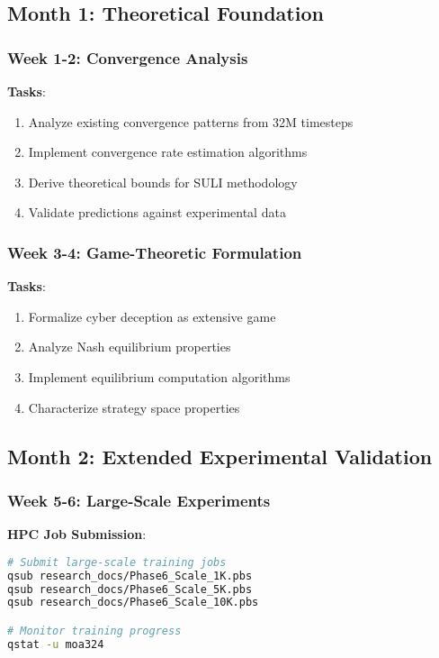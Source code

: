 \documentclass[11pt]{article}
\begin{document}
\subsection{Month 1: Theoretical Foundation}

\subsubsection{Week 1-2: Convergence Analysis}
\textbf{Tasks}:
\begin{enumerate}
\item Analyze existing convergence patterns from 32M timesteps
\item Implement convergence rate estimation algorithms
\item Derive theoretical bounds for SULI methodology
\item Validate predictions against experimental data
\end{enumerate}

\subsubsection{Week 3-4: Game-Theoretic Formulation}
\textbf{Tasks}:
\begin{enumerate}
\item Formalize cyber deception as extensive game
\item Analyze Nash equilibrium properties
\item Implement equilibrium computation algorithms
\item Characterize strategy space properties
\end{enumerate}

\subsection{Month 2: Extended Experimental Validation}

\subsubsection{Week 5-6: Large-Scale Experiments}
\textbf{HPC Job Submission}:
\begin{lstlisting}[language=bash]
# Submit large-scale training jobs
qsub research_docs/Phase6_Scale_1K.pbs
qsub research_docs/Phase6_Scale_5K.pbs  
qsub research_docs/Phase6_Scale_10K.pbs

# Monitor training progress
qstat -u moa324
\end{lstlisting}
\end{document}
